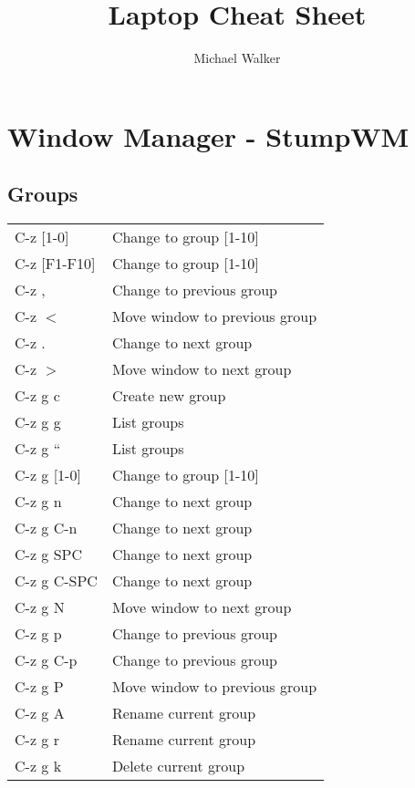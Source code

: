 \documentclass[10pt,a4paper,oneside]{article}
\author{Michael Walker}
\title{Laptop Cheat Sheet}
\begin{document}
\maketitle{}

\tableofcontents

\pagebreak

\section{Window Manager - StumpWM}
\subsection{Groups}
\begin{center}
  \begin{tabular}{|l|l|}
    \hline
    C-z [1-0]    & Change to group [1-10]\\
    C-z [F1-F10] & Change to group [1-10]\\
    C-z ,        & Change to previous group\\
    C-z $<$      & Move window to previous group\\
    C-z .        & Change to next group\\
    C-z $>$      & Move window to next group\\
    C-z g c      & Create new group\\ 
    C-z g g      & List groups\\
    C-z g ``     & List groups\\
    C-z g [1-0]  & Change to group [1-10]\\
    C-z g n      & Change to next group\\
    C-z g C-n    & Change to next group\\
    C-z g SPC    & Change to next group\\
    C-z g C-SPC  & Change to next group\\
    C-z g N      & Move window to next group\\
    C-z g p      & Change to previous group\\
    C-z g C-p    & Change to previous group\\
    C-z g P      & Move window to previous group\\
    C-z g A      & Rename current group\\
    C-z g r      & Rename current group\\
    C-z g k      & Delete current group\\
    \hline 
  \end{tabular}
\end{center}
\end{document}
